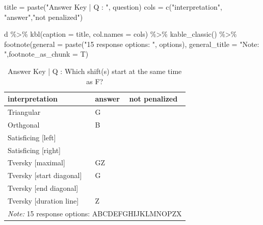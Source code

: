 \documentclass[
  letterpaper,
  DIV=11,
  numbers=noendperiod]{scrreprt}
\newenvironment{Shaded}{\begin{snugshade}}{\end{snugshade}}
\newcommand{\AttributeTok}[1]{\textcolor[rgb]{0.40,0.45,0.13}{#1}}
\newcommand{\FunctionTok}[1]{\textcolor[rgb]{0.28,0.35,0.67}{#1}}
\newcommand{\NormalTok}[1]{\textcolor[rgb]{0.00,0.23,0.31}{#1}}
\newcommand{\OtherTok}[1]{\textcolor[rgb]{0.00,0.23,0.31}{#1}}
\newcommand{\SpecialCharTok}[1]{\textcolor[rgb]{0.37,0.37,0.37}{#1}}
\newcommand{\StringTok}[1]{\textcolor[rgb]{0.13,0.47,0.30}{#1}}
\begin{document}
\begin{Shaded}
\begin{Highlighting}[]
\NormalTok{title }\OtherTok{=} \FunctionTok{paste}\NormalTok{(}\StringTok{"Answer Key | Q : "}\NormalTok{, question)}
\NormalTok{cols }\OtherTok{=} \FunctionTok{c}\NormalTok{(}\StringTok{"interpretation"}\NormalTok{, }\StringTok{"answer"}\NormalTok{,}\StringTok{"not penalized"}\NormalTok{)}

\NormalTok{d }\SpecialCharTok{\%\textgreater{}\%} \FunctionTok{kbl}\NormalTok{(}\AttributeTok{caption =}\NormalTok{ title, }\AttributeTok{col.names =}\NormalTok{ cols) }\SpecialCharTok{\%\textgreater{}\%} \FunctionTok{kable\_classic}\NormalTok{() }\SpecialCharTok{\%\textgreater{}\%}
  \FunctionTok{footnote}\NormalTok{(}\AttributeTok{general =} \FunctionTok{paste}\NormalTok{(}\StringTok{"15 response options: "}\NormalTok{, options), }\AttributeTok{general\_title =} \StringTok{"Note: "}\NormalTok{,}\AttributeTok{footnote\_as\_chunk =}\NormalTok{ T)}
\end{Highlighting}
\end{Shaded}

\begin{table}

\caption{Answer Key | Q :  Which shift(s) start at the same time as F?}
\centering
\begin{tabular}[t]{l|l|l}
\hline
interpretation & answer & not penalized\\
\hline
Triangular & G & \\
\hline
Orthgonal & B & \\
\hline
Satisficing [left] &  & \\
\hline
Satisficing [right] &  & \\
\hline
Tversky [maximal] & GZ & \\
\hline
Tversky [start diagonal] & G & \\
\hline
Tversky [end diagonal] &  & \\
\hline
Tversky [duration line] & Z & \\
\hline
\multicolumn{3}{l}{\rule{0pt}{1em}\textit{Note: } 15 response options:  ABCDEFGHIJKLMNOPZX}\\
\end{tabular}
\end{table}
\end{document}
